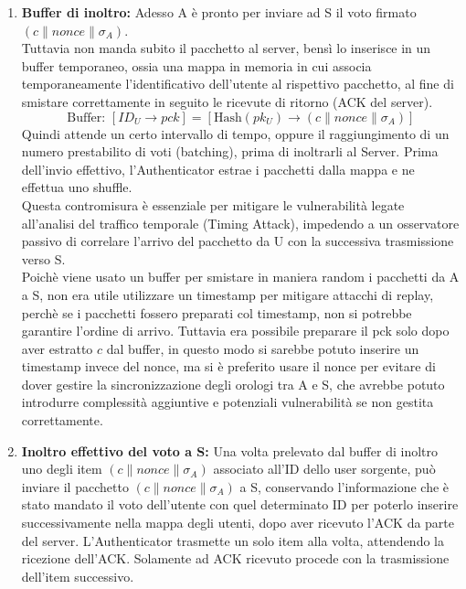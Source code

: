 \begin{enumerate}
			\item \textbf{Buffer di inoltro:} Adesso A è pronto per inviare ad S il voto firmato $(c\| nonce \| \sigma_{A})$.\\
			Tuttavia non manda subito il pacchetto al server, bensì lo inserisce in un buffer temporaneo, ossia una mappa in memoria in cui associa temporaneamente l'identificativo dell'utente al rispettivo pacchetto, al fine di smistare correttamente in seguito le ricevute di ritorno (ACK del server).
			$$ \text{Buffer: } [ID_U \to pck]=[\text{Hash}(pk_U) \to (c\| nonce \| \sigma_{A})] $$
			Quindi attende un certo intervallo di tempo, oppure il raggiungimento di un numero prestabilito di voti (batching), prima di inoltrarli al Server. Prima dell'invio effettivo, l'Authenticator estrae i pacchetti dalla mappa e ne effettua uno shuffle.\\
			Questa contromisura è essenziale per mitigare le vulnerabilità legate all'analisi del traffico temporale (Timing Attack), impedendo a un osservatore passivo di correlare l'arrivo del pacchetto da U con la successiva trasmissione verso S.\\
			Poichè viene usato un buffer per smistare in maniera random i pacchetti da A a S, non era utile utilizzare un timestamp per mitigare attacchi di replay, perchè se i pacchetti fossero preparati col timestamp, non si potrebbe garantire l'ordine di arrivo. Tuttavia era possibile preparare il pck solo dopo aver estratto $c$ dal buffer, in questo modo si sarebbe potuto inserire un timestamp invece del nonce, ma si è preferito usare il nonce per evitare di dover gestire la sincronizzazione degli orologi tra A e S, che avrebbe potuto introdurre complessità aggiuntive e potenziali vulnerabilità se non gestita correttamente.
			
			\item \textbf{Inoltro effettivo del voto a S:} Una volta prelevato dal buffer di inoltro uno degli item $(c\| nonce \| \sigma_{A})$ associato all'ID dello user sorgente, può inviare il pacchetto $(c\| nonce \| \sigma_{A})$ a S, conservando l'informazione che è stato mandato il voto dell'utente con quel determinato ID per poterlo inserire successivamente nella mappa degli utenti, dopo aver ricevuto l'ACK da parte del server. L'Authenticator trasmette un solo item alla volta, attendendo la ricezione dell'ACK. Solamente ad ACK ricevuto procede con la trasmissione dell'item successivo.
		\end{enumerate}
	
	
	
